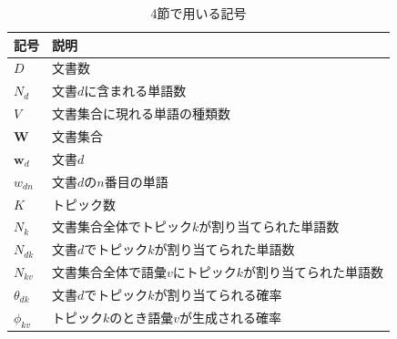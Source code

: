 \documentclass{ltjarticle}
\begin{document}
\begin{table}[h]
    \caption{4節で用いる記号}
    \vspace{5truept}

    \centering
    \begin{tabular}{ll}
        \hline
        記号 & 説明 \\
        \hline\hline
        $D$ & 文書数\\
        $N_d$ & 文書$d$に含まれる単語数\\
        $V$ & 文書集合に現れる単語の種類数\\
        $\boldsymbol{W}$ & 文書集合\\
        $\boldsymbol{w}_d$ & 文書$d$\\
        $w_{dn}$ & 文書$d$の$n$番目の単語\\
        $K$ & トピック数\\
        $N_k$ & 文書集合全体でトピック$k$が割り当てられた単語数\\
        $N_{dk}$ & 文書$d$でトピック$k$が割り当てられた単語数\\
        $N_{kv}$ & 文書集合全体で語彙$v$にトピック$k$が割り当てられた単語数\\
        $\theta_{dk}$ & 文書$d$でトピック$k$が割り当てられる確率\\
        $\phi_{kv}$ & トピック$k$のとき語彙$v$が生成される確率\\
        \hline
    \end{tabular}
    \label{table:記号}
\end{table}
\end{document}
